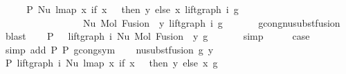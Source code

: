 \begin{isabellebody}
\ \ \isamarkupfalse%
\ \isamarkupfalse%
\ P{}{\isacharcolon}{\kern0pt}\ {\isachardoublequoteopen}Nu\ {\isacharparenleft}{\kern0pt}lmap\ {\isacharparenleft}{\kern0pt}{\isasymlambda}x{\isachardot}{\kern0pt}\ if\ x\ {\isacharequal}{\kern0pt}\ {}\ then\ y\ else\ x{\isacharparenright}{\kern0pt}\ {\isacharparenleft}{\kern0pt}lift{\isacharunderscore}{\kern0pt}graph\ i\ g{\isacharparenright}{\kern0pt}{\isacharparenright}{\kern0pt}\ {\isasymsimeq}\isanewline
\ \ \ \ \ \ \ \ \ \ \ \ \ \ \ \ \ Nu\ {\isacharparenleft}{\kern0pt}Mol\ {\isacharparenleft}{\kern0pt}Fusion\ {}\ y{\isacharparenright}{\kern0pt}\ {\isacharparenleft}{\kern0pt}lift{\isacharunderscore}{\kern0pt}graph\ i\ g{\isacharparenright}{\kern0pt}{\isacharparenright}{\kern0pt}{\isachardoublequoteclose}\isanewline
\ \ \ \ \ \isamarkupfalse%
\ gcong{\isachardot}{\kern0pt}nu{\isacharunderscore}{\kern0pt}subst{\isacharunderscore}{\kern0pt}fusion{}\ \isamarkupfalse%
\ blast\isanewline
\ \ \isamarkupfalse%
\ P{}{\isacharcolon}{\kern0pt}\ {\isachardoublequoteopen}{\isachardot}{\kern0pt}{\isachardot}{\kern0pt}{\isachardot}{\kern0pt}\ {\isacharequal}{\kern0pt}\ lift{\isacharunderscore}{\kern0pt}graph\ i\ {\isacharparenleft}{\kern0pt}Nu\ {\isacharparenleft}{\kern0pt}Mol\ {\isacharparenleft}{\kern0pt}Fusion\ {}\ y{\isacharparenright}{\kern0pt}\ g{\isacharparenright}{\kern0pt}{\isacharparenright}{\kern0pt}{\isachardoublequoteclose}\isanewline
\ \ \ \ \ \isamarkupfalse%
\ simp\isanewline
\ \ \isamarkupfalse%
\ \isamarkupfalse%
\ {\isacharquery}{\kern0pt}case\isanewline
\ \ \ \ \ \isamarkupfalse%
\ {\isacharparenleft}{\kern0pt}simp\ add{\isacharcolon}{\kern0pt}\ P{}\ P{}\ gcong{\isachardot}{\kern0pt}sym{\isacharparenright}{\kern0pt}\isanewline
{}\isamarkupfalse%
\isanewline
\ \ \isamarkupfalse%
\ {\isacharparenleft}{\kern0pt}nu{\isacharunderscore}{\kern0pt}subst{\isacharunderscore}{\kern0pt}fusion{}\ g\ y{\isacharparenright}{\kern0pt}\isanewline
\ \ \isamarkupfalse%
\ P{}{\isacharcolon}{\kern0pt}\ {\isachardoublequoteopen}lift{\isacharunderscore}{\kern0pt}graph\ i\ {\isacharparenleft}{\kern0pt}Nu\ {\isacharparenleft}{\kern0pt}lmap\ {\isacharparenleft}{\kern0pt}{\isasymlambda}x{\isachardot}{\kern0pt}\ if\ x\ {\isacharequal}{\kern0pt}\ {}\ then\ y\ else\ x{\isacharparenright}{\kern0pt}\ g{\isacharparenright}{\kern0pt}{\isacharparenright}{\kern0pt}\ {\isacharequal}{\kern0pt}\isanewline

\end{isabellebody}

